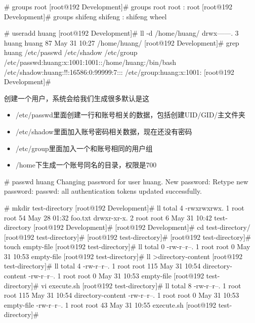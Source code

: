 \begin{Bash}# groups
root
[root@192 Development]# groups root
root : root
[root@192 Development]# groups shifeng
shifeng : shifeng wheel
\end{Bash}

\begin{Bash}# useradd huang
[root@192 Development]# ll -d /home/huang/
drwx------. 3 huang huang 87 May 31 10:27 /home/huang/
[root@192 Development]# grep huang /etc/passwd /etc/shadow /etc/group
/etc/passwd:huang:x:1001:1001::/home/huang:/bin/bash
/etc/shadow:huang:!!:16586:0:99999:7:::
/etc/group:huang:x:1001:
[root@192 Development]# 
\end{Bash}
创建一个用户，系统会给我们生成很多默认是这
\begin{itemize}
\item /etc/passwd里面创建一行和账号相关的数据，包括创建UID/GID/主文件夹
\item /etc/shadow里面加入账号密码相关数据，现在还没有密码
\item /etc/group里面加入一个和账号相同的用户组
\item /home下生成一个账号同名的目录，权限是700
\end{itemize}

\begin{Bash}# passwd huang
Changing password for user huang.
New password: 
Retype new password: 
passwd: all authentication tokens updated successfully.
\end{Bash}



\begin{Bash}# mkdir test-directory
[root@192 Development]# ll
total 4
-rwxrwxrwx. 1 root root 54 May 28 01:32 foo.txt
drwxr-xr-x. 2 root root  6 May 31 10:42 test-directory
[root@192 Development]# 
[root@192 Development]# cd test-directory/
[root@192 test-directory]# 
[root@192 test-directory]# 
[root@192 test-directory]# touch empty-file
[root@192 test-directory]# ll
total 0
-rw-r--r--. 1 root root 0 May 31 10:53 empty-file
[root@192 test-directory]# ll >directory-content
[root@192 test-directory]# ll
total 4
-rw-r--r--. 1 root root 115 May 31 10:54 directory-content
-rw-r--r--. 1 root root   0 May 31 10:53 empty-file
[root@192 test-directory]# vi execute.sh
[root@192 test-directory]# ll
total 8
-rw-r--r--. 1 root root 115 May 31 10:54 directory-content
-rw-r--r--. 1 root root   0 May 31 10:53 empty-file
-rw-r--r--. 1 root root  43 May 31 10:55 execute.sh
[root@192 test-directory]# 

\end{Bash}

